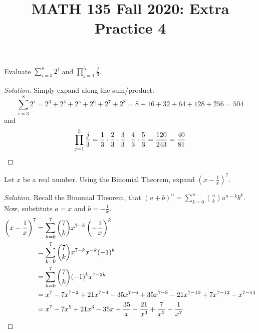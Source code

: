 
\title{MATH 135 Fall 2020: Extra Practice 4}


\thispagestyle{firstpage}

\textbf{\@title}


\question Evaluate $\displaystyle\sum^8_{i=3}2^i$ and $\displaystyle\prod^5_{j=1}\frac{j}{3}$.
\begin{proof}[Solution]
  Simply expand along the sum/product:
  \[ \sum^8_{i=3}2^i = 2^3 + 2^4 + 2^5 + 2^6 + 2^7 + 2^8 = 8+16+32+64+128+256 = 504 \]
  and
  \begin{equation*}
    \prod^5_{j=1}\frac{j}{3}
    = \frac13\cdot\frac23\cdot\frac33\cdot\frac43\cdot\frac53
    = \frac{120}{243}
    = \frac{40}{81} \qedhere
  \end{equation*}
\end{proof}


\question Let $x$ be a real number.
Using the Binomial Theorem, expand $\left(x-\frac{1}{x}\right)^7$.
\begin{proof}[Solution]
  Recall the Binomial Theorem, that $(a+b)^n = \sum_{k=0}^n\binom{n}{k}a^{n-k}b^k$.
  Now, substitute $a = x$ and $b = -\frac{1}{x}$.
  \begin{align*}
    \left(x-\frac{1}{x}\right)^7
     & = \sum_{k=0}^7\binom{7}{k}x^{7-k}\left(-\frac{1}{x}\right)^k                          \\
     & = \sum_{k=0}^7\binom{7}{k}x^{7-k}x^{-k}(-1)^k                                         \\
     & = \sum_{k=0}^7\binom{7}{k}(-1)^k x^{7-2k}                                             \\
     & = x^7-7x^{7-2}+21x^{7-4}-35x^{7-6}+35x^{7-8}-21x^{7-10}+7x^{7-12}-x^{7-14}            \\
     & = x^7-7x^5+21x^3-35x+\frac{35}{x}-\frac{21}{x^3}+\frac{7}{x^5}-\frac{1}{x^7} \qedhere
  \end{align*}
\end{proof}



